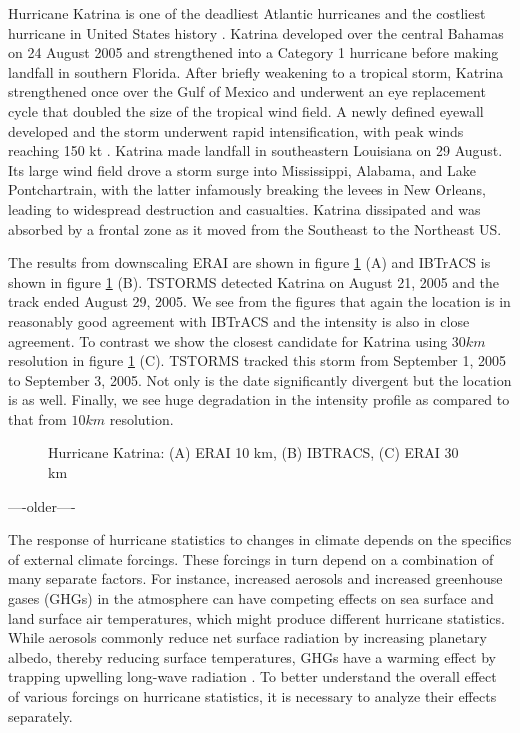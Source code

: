 Hurricane Katrina is one of the deadliest Atlantic hurricanes and the costliest hurricane in United States history \cite{beven}.  Katrina developed over the central Bahamas on 24 August 2005 and strengthened into a Category 1 hurricane before making landfall in southern Florida.  After briefly weakening to a tropical storm, Katrina strengthened once over the Gulf of Mexico and underwent an eye replacement cycle that doubled the size of the tropical wind field.  A newly defined eyewall developed and the storm underwent rapid intensification, with peak winds reaching 150 kt \cite{beven}.  Katrina made landfall in southeastern Louisiana on 29 August.  Its large wind field drove a storm surge into Mississippi, Alabama, and Lake Pontchartrain, with the latter infamously breaking the levees in New Orleans, leading to widespread destruction and casualties.  Katrina dissipated and was absorbed by a frontal zone as it moved from the Southeast to the Northeast US.
\par
The results from downscaling ERAI are shown in figure \ref{katrina_tracks} (A) and IBTrACS is shown in figure \ref{katrina_tracks} (B). TSTORMS detected Katrina on August 21, 2005 and the track ended August 29, 2005. We see from the figures that again the location is in reasonably good agreement with IBTrACS and the intensity is also in close agreement. To contrast we show the closest candidate for Katrina using $30km$ resolution in figure \ref{katrina_tracks} (C). TSTORMS tracked this storm from September 1, 2005 to September 3, 2005. Not only is the date significantly divergent but the location is as well. Finally, we see huge degradation in the intensity profile as compared to that from $10km$ resolution.    

\begin{figure}[!tbp]
\centering
\caption{Hurricane Katrina: (A) ERAI 10 km, (B) IBTRACS, (C) ERAI 30 km}
\label{katrina_tracks}
\end{figure}


----older----

The response of hurricane statistics to changes in climate depends on the specifics of
external climate forcings. These forcings in turn depend on a
combination of many separate factors. For instance, increased aerosols
and increased greenhouse gases (GHGs) in the atmosphere can have
competing effects on sea surface and land surface air temperatures,
which might produce different hurricane statistics. While aerosols
commonly reduce net surface radiation by increasing planetary albedo,
thereby reducing surface temperatures, GHGs have a warming effect by
trapping upwelling long-wave radiation \cite{ipcc_2007}. To better
understand the overall effect of various forcings on hurricane
statistics, it is necessary to analyze their effects separately.


